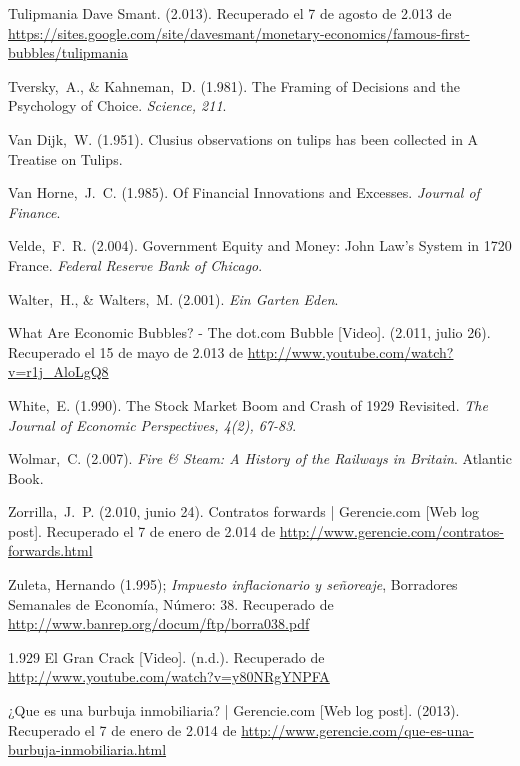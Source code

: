 \begin{thebibliography}{11}
	\bibitem{}
		Tulipmania Dave Smant. (2.013). Recuperado el 7 de agosto de 2.013 de \url{https://sites.google.com/site/davesmant/monetary-economics/famous-first-bubbles/tulipmania}

	\bibitem{}
		Tversky, A., \& Kahneman, D. (1.981). The Framing of Decisions and the Psychology of Choice. \emph{Science, 211}. 

	\bibitem{}
		Van Dijk, W. (1.951). Clusius observations on tulips has been collected in A Treatise on Tulips.

	\bibitem{}
		Van Horne, J. C. (1.985). Of Financial Innovations and Excesses. \emph{Journal of Finance}. 

	\bibitem{}
		Velde, F. R. (2.004). Government Equity and Money: John Law’s System in 1720 France. \emph{Federal Reserve Bank of Chicago}. 	

	\bibitem{}
		Walter, H., \& Walters, M. (2.001). \emph{Ein Garten Eden}. 	

	\bibitem{}
		What Are Economic Bubbles? - The dot.com Bubble [Video]. (2.011, julio 26). Recuperado el 15 de mayo de 2.013 de \url{http://www.youtube.com/watch?v=r1j\_AloLgQ8}

	\bibitem{}
		White, E. (1.990). The Stock Market Boom and Crash of 1929 Revisited. \emph{The Journal of Economic Perspectives, 4(2), 67-83}. 

	\bibitem{}
		Wolmar, C. (2.007). \emph{Fire \& Steam: A History of the Railways in Britain}. Atlantic Book.

	\bibitem{}
		Zorrilla, J. P. (2.010, junio 24). Contratos forwards | Gerencie.com [Web log post]. Recuperado el 7 de enero de 2.014 de \url{http://www.gerencie.com/contratos-forwards.html} 

	\bibitem{}
		Zuleta, Hernando (1.995); \emph{Impuesto inflacionario y señoreaje}, Borradores Semanales de Economía, Número: 38. Recuperado de \url{http://www.banrep.org/docum/ftp/borra038.pdf}

	\bibitem{}
		1.929 El Gran Crack [Video]. (n.d.). Recuperado de \url{http://www.youtube.com/watch?v=y80NRgYNPFA}

	\bibitem{}
		¿Que es una burbuja inmobiliaria? | Gerencie.com [Web log post]. (2013). Recuperado el 7 de enero de 2.014 de \url{http://www.gerencie.com/que-es-una-burbuja-inmobiliaria.html}

\end{thebibliography}
